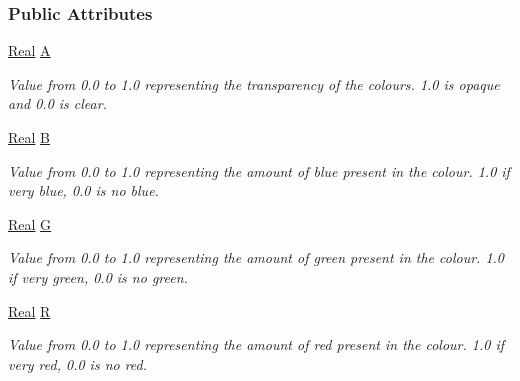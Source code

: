 \subsubsection*{Public Attributes}
\begin{DoxyCompactItemize}
\item 
\hypertarget{classphys_1_1ColourValue_ae7bfb3493f467b07e2d2796b8812b317}{
\hyperlink{namespacephys_af7eb897198d265b8e868f45240230d5f}{Real} \hyperlink{classphys_1_1ColourValue_ae7bfb3493f467b07e2d2796b8812b317}{A}}
\label{classphys_1_1ColourValue_ae7bfb3493f467b07e2d2796b8812b317}

\begin{DoxyCompactList}\small\item\em Value from 0.0 to 1.0 representing the transparency of the colours. 1.0 is opaque and 0.0 is clear. \item\end{DoxyCompactList}\item 
\hypertarget{classphys_1_1ColourValue_af206831fc141ebf36e8d3b8d53663701}{
\hyperlink{namespacephys_af7eb897198d265b8e868f45240230d5f}{Real} \hyperlink{classphys_1_1ColourValue_af206831fc141ebf36e8d3b8d53663701}{B}}
\label{classphys_1_1ColourValue_af206831fc141ebf36e8d3b8d53663701}

\begin{DoxyCompactList}\small\item\em Value from 0.0 to 1.0 representing the amount of blue present in the colour. 1.0 if very blue, 0.0 is no blue. \item\end{DoxyCompactList}\item 
\hypertarget{classphys_1_1ColourValue_a090f0e8f08c52722fbfc8f040436fa7a}{
\hyperlink{namespacephys_af7eb897198d265b8e868f45240230d5f}{Real} \hyperlink{classphys_1_1ColourValue_a090f0e8f08c52722fbfc8f040436fa7a}{G}}
\label{classphys_1_1ColourValue_a090f0e8f08c52722fbfc8f040436fa7a}

\begin{DoxyCompactList}\small\item\em Value from 0.0 to 1.0 representing the amount of green present in the colour. 1.0 if very green, 0.0 is no green. \item\end{DoxyCompactList}\item 
\hypertarget{classphys_1_1ColourValue_aeea3df8afd8e270053c139d55b3acc9f}{
\hyperlink{namespacephys_af7eb897198d265b8e868f45240230d5f}{Real} \hyperlink{classphys_1_1ColourValue_aeea3df8afd8e270053c139d55b3acc9f}{R}}
\label{classphys_1_1ColourValue_aeea3df8afd8e270053c139d55b3acc9f}

\begin{DoxyCompactList}\small\item\em Value from 0.0 to 1.0 representing the amount of red present in the colour. 1.0 if very red, 0.0 is no red. \item\end{DoxyCompactList}\end{DoxyCompactItemize}



